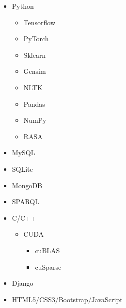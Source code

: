 \documentclass[11pt,a4paper,sans]{moderncv} %
\begin{document}
	\begin{cvcolumns}
		{
			\vspace{-2em}
			\begin{multicols}{2}
				\begin{itemize}
					\item Python
					\begin{itemize}
						\item Tensorflow
						\item PyTorch
						\item Sklearn
						\item Gensim
						\item NLTK
						\item Pandas
						\item NumPy
						\item RASA
					\end{itemize}
					\item MySQL
					\item SQLite
					\item MongoDB
					\item SPARQL
					\item C/C++ 
					\begin{itemize}
						\item CUDA
						\begin{itemize}
							\item cuBLAS
							\item cuSparse
						\end{itemize}
					\end{itemize}
					\item Django
					\item HTML5/CSS3/Bootstrap/JavaScript
				\end{itemize}
			\end{multicols}
		}
		
		
	\end{cvcolumns}
\end{document}
